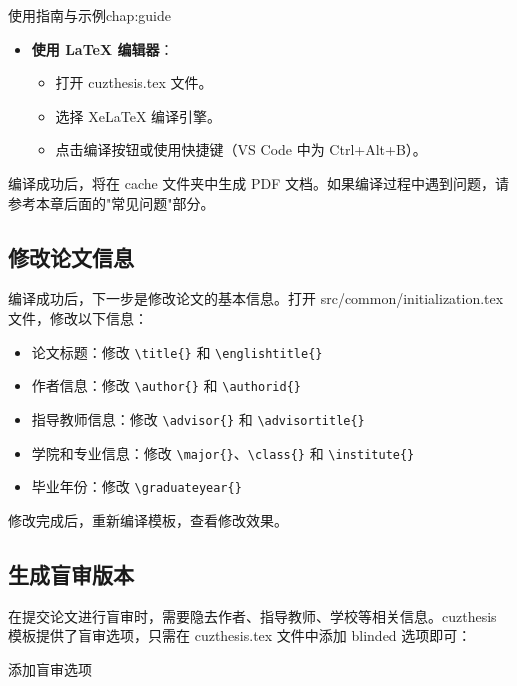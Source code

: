 \begin{cuzchapter}{使用指南与示例}{chap:guide}
\begin{itemize}
        \item \textbf{使用 LaTeX 编辑器}：
        \begin{itemize}
            \item 打开 cuzthesis.tex 文件。
            \item 选择 XeLaTeX 编译引擎。
            \item 点击编译按钮或使用快捷键（VS Code 中为 Ctrl+Alt+B）。
        \end{itemize}
    \end{itemize}

    编译成功后，将在 cache 文件夹中生成 PDF 文档。如果编译过程中遇到问题，请参考本章后面的"常见问题"部分。

    \subsection{修改论文信息}

    编译成功后，下一步是修改论文的基本信息。打开 src/common/initialization.tex 文件，修改以下信息：

    \begin{itemize}
        \item 论文标题：修改 \verb|\title{}| 和 \verb|\englishtitle{}|
        \item 作者信息：修改 \verb|\author{}| 和 \verb|\authorid{}|
        \item 指导教师信息：修改 \verb|\advisor{}| 和 \verb|\advisortitle{}|
        \item 学院和专业信息：修改 \verb|\major{}|、\verb|\class{}| 和 \verb|\institute{}|
        \item 毕业年份：修改 \verb|\graduateyear{}|
    \end{itemize}

    修改完成后，重新编译模板，查看修改效果。

    \subsection{生成盲审版本}

    在提交论文进行盲审时，需要隐去作者、指导教师、学校等相关信息。cuzthesis 模板提供了盲审选项，只需在 cuzthesis.tex 文件中添加 blinded 选项即可：

    \begin{listing}[htbp]
        \caption{添加盲审选项}
        \label{code:blinded-option}
\end{listing}
\end{cuzchapter}
